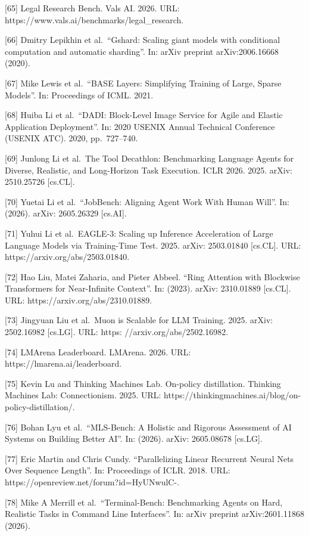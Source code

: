 \documentclass[
  10
]{article}
\begin{document}
{[}65{]} Legal Research Bench. Vals AI. 2026. URL:
https://www.vals.ai/benchmarks/legal\_research.

{[}66{]} Dmitry Lepikhin et al.~``Gshard: Scaling giant models with
conditional computation and automatic sharding''. In: arXiv preprint
arXiv:2006.16668 (2020).

{[}67{]} Mike Lewis et al.~``BASE Layers: Simplifying Training of Large,
Sparse Models''. In: Proceedings of ICML. 2021.

{[}68{]} Huiba Li et al.~``DADI: Block-Level Image Service for Agile and
Elastic Application Deployment''. In: 2020 USENIX Annual Technical
Conference (USENIX ATC). 2020, pp.~727--740.

{[}69{]} Junlong Li et al.~The Tool Decathlon: Benchmarking Language
Agents for Diverse, Realistic, and Long-Horizon Task Execution. ICLR
2026. 2025. arXiv: 2510.25726 {[}cs.CL{]}.

{[}70{]} Yuetai Li et al.~``JobBench: Aligning Agent Work With Human
Will''. In: (2026). arXiv: 2605.26329 {[}cs.AI{]}.

{[}71{]} Yuhui Li et al.~EAGLE-3: Scaling up Inference Acceleration of
Large Language Models via Training-Time Test. 2025. arXiv: 2503.01840
{[}cs.CL{]}. URL: https://arxiv.org/abs/2503.01840.

{[}72{]} Hao Liu, Matei Zaharia, and Pieter Abbeel. ``Ring Attention
with Blockwise Transformers for Near-Infinite Context''. In: (2023).
arXiv: 2310.01889 {[}cs.CL{]}. URL: https://arxiv.org/abs/2310.01889.

{[}73{]} Jingyuan Liu et al.~Muon is Scalable for LLM Training. 2025.
arXiv: 2502.16982 {[}cs.LG{]}. URL: https: //arxiv.org/abs/2502.16982.

{[}74{]} LMArena Leaderboard. LMArena. 2026. URL:
https://lmarena.ai/leaderboard.

{[}75{]} Kevin Lu and Thinking Machines Lab. On-policy distillation.
Thinking Machines Lab: Connectionism. 2025. URL:
https://thinkingmachines.ai/blog/on-policy-distillation/.

{[}76{]} Bohan Lyu et al.~``MLS-Bench: A Holistic and Rigorous
Assessment of AI Systems on Building Better AI''. In: (2026). arXiv:
2605.08678 {[}cs.LG{]}.

{[}77{]} Eric Martin and Chris Cundy. ``Parallelizing Linear Recurrent
Neural Nets Over Sequence Length''. In: Proceedings of ICLR. 2018. URL:
https://openreview.net/forum?id=HyUNwulC-.

{[}78{]} Mike A Merrill et al.~``Terminal-Bench: Benchmarking Agents on
Hard, Realistic Tasks in Command Line Interfaces''. In: arXiv preprint
arXiv:2601.11868 (2026).
\end{document}
